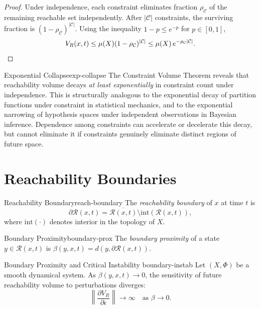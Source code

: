 \documentclass[12pt,twoside,openright]{book}
\newcommand{\reach}{\mathcal{R}}
\begin{document}
\begin{proof}
  Under independence, each constraint eliminates fraction
  $\rho_\mathcal{C}$ of the remaining reachable set
  independently. After $|\mathcal{C}|$ constraints, the
  surviving fraction is
  $(1-\rho_\mathcal{C})^{|\mathcal{C}|}$. Using the
  inequality $1-p\le e^{-p}$ for $p\in[0,1]$,
  \[
    V_R(x,t)
    \le \mu(X)(1-\rho_\mathcal{C})^{|\mathcal{C}|}
    \le \mu(X)\,e^{-\rho_\mathcal{C}|\mathcal{C}|}. \qedhere
  \]
\end{proof}

\begin{remark}{Exponential Collapse}{exp-collapse}
  The Constraint Volume Theorem reveals that reachability
  volume decays \emph{at least exponentially} in constraint
  count under independence. This is structurally analogous
  to the exponential decay of partition functions under
  constraint in statistical mechanics, and to the
  exponential narrowing of hypothesis spaces under
  independent observations in Bayesian inference.
  Dependence among constraints can accelerate or decelerate
  this decay, but cannot eliminate it if constraints
  genuinely eliminate distinct regions of future space.
\end{remark}

\section{Reachability Boundaries}
\label{sec:ch13-boundary}

\begin{definition}{Reachability Boundary}{reach-boundary}
  The \emph{reachability boundary} of $x$ at time $t$ is
  \[
    \partial\reach(x,t)
    = \overline{\reach(x,t)} \setminus
      \mathrm{int}(\reach(x,t)),
  \]
  where $\mathrm{int}(\cdot)$ denotes interior in the
  topology of $X$.
\end{definition}

\begin{definition}{Boundary Proximity}{boundary-prox}
  The \emph{boundary proximity} of a state
  $y\in\reach(x,t)$ is
  $\beta(y,x,t) = d(y,\partial\reach(x,t))$.
\end{definition}

\begin{theorem}{Boundary Proximity and Critical Instability}%
  {boundary-instab}
  Let $(X,\Phi)$ be a smooth dynamical system. As
  $\beta(y,x,t)\to0$, the sensitivity of future
  reachability volume to perturbations diverges:
  \[
    \left\|\frac{\partial V_R}{\partial\epsilon}\right\|
    \to \infty \quad \text{as } \beta \to 0.
  \]
\end{theorem}
\end{document}

